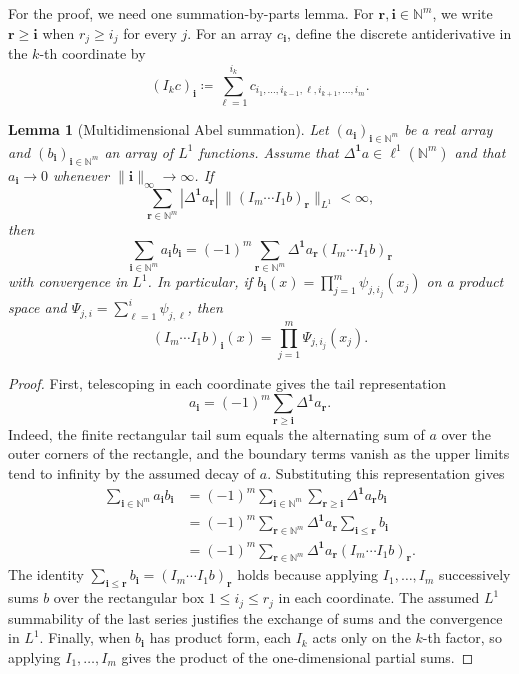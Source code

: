 \documentclass{article}
\numberwithin{theorem}{section}
\newtheorem{lemma}[theorem]{Lemma}
\theoremstyle{definition}
\begin{document}
For the proof, we need one summation-by-parts lemma.
For $\bm r,\bm i\in \mathbb N^m$, we write $\bm r\ge \bm i$ when $r_j\ge i_j$ for every $j$.
For an array $c_{\bm i}$, define the discrete antiderivative in the $k$-th coordinate by
    $$(I_kc)_{\bm i}\coloneqq\sum_{\ell=1}^{i_k}c_{i_1,\dots,i_{k-1},\ell,i_{k+1},\dots,i_m}.$$
\begin{lemma}[Multidimensional Abel summation]\label{lem:multi_abel}
    Let $(a_{\bm i})_{\bm i\in\mathbb N^m}$ be a real array and $(b_{\bm i})_{\bm i\in\mathbb N^m}$ an array of $L^1$ functions. 
     Assume that $\Delta^{\bm 1}a\in\ell^1(\mathbb N^m)$ and that $a_{\bm i}\to 0$ whenever $\|\bm i\|_\infty\to\infty$.
    If 
    $$\sum_{\bm r\in\mathbb N^m}|\Delta^{\bm 1}a_{\bm r}|\,\|(I_m\cdots I_1b)_{\bm r}\|_{L^1}<\infty,$$
    then
    $$\sum_{\bm i\in\mathbb N^m}a_{\bm i}b_{\bm i}
    =(-1)^m\sum_{\bm r\in\mathbb N^m}\Delta^{\bm 1}a_{\bm r}(I_m\cdots I_1b)_{\bm r}$$
    with convergence in $L^1$. In particular, if $b_{\bm i}(x)=\prod_{j=1}^m\psi_{j,i_j}(x_j)$ on a product space and $\Psi_{j,i}=\sum_{\ell=1}^i\psi_{j,\ell}$, then
    $$(I_m\cdots I_1b)_{\bm i}(x)=\prod_{j=1}^m\Psi_{j,i_j}(x_j).$$
\end{lemma}
\begin{proof}
    First, telescoping in each coordinate gives the tail representation
    $$a_{\bm i}=(-1)^m\sum_{\bm r\ge \bm i}\Delta^{\bm 1}a_{\bm r}.$$
    Indeed, the finite rectangular tail sum equals the alternating sum of $a$ over the outer corners of the rectangle, and the boundary terms vanish as the upper limits tend to infinity by the assumed decay of $a$. Substituting this representation gives
    \begin{align*}
        \sum_{\bm i\in\mathbb N^m}a_{\bm i}b_{\bm i}
        &=(-1)^m\sum_{\bm i\in\mathbb N^m}\sum_{\bm r\ge \bm i}\Delta^{\bm 1}a_{\bm r}b_{\bm i}\\
        &=(-1)^m\sum_{\bm r\in\mathbb N^m}\Delta^{\bm 1}a_{\bm r}\sum_{\bm i\le \bm r}b_{\bm i}\\
        &=(-1)^m\sum_{\bm r\in\mathbb N^m}\Delta^{\bm 1}a_{\bm r}(I_m\cdots I_1b)_{\bm r}.
    \end{align*}
    The identity $\sum_{\bm i\le \bm r}b_{\bm i}=(I_m\cdots I_1b)_{\bm r}$ holds because applying $I_1,\dots,I_m$ successively sums $b$ over the rectangular box $1\le i_j\le r_j$ in each coordinate. The assumed $L^1$ summability of the last series justifies the exchange of sums and the convergence in $L^1$. Finally, when $b_{\bm i}$ has product form, each $I_k$ acts only on the $k$-th factor, so applying $I_1,\dots,I_m$ gives the product of the one-dimensional partial sums.
\end{proof}
\end{document}
